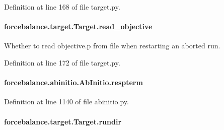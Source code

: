 Definition at line 168 of file target.\-py.

\hypertarget{classforcebalance_1_1target_1_1Target_a22bdc4bbce2020ae44b44ad3e444fda6}{
\paragraph[{read\-\_\-objective}]{\setlength{\rightskip}{0pt plus 5cm}forcebalance.\-target.\-Target.\-read\-\_\-objective\hspace{0.3cm}{\ttfamily [inherited]}}}\label{classforcebalance_1_1target_1_1Target_a22bdc4bbce2020ae44b44ad3e444fda6}


Whether to read objective.\-p from file when restarting an aborted run. 



Definition at line 172 of file target.\-py.

\hypertarget{classforcebalance_1_1abinitio_1_1AbInitio_a689e3849518b33539442a473a41ed32d}{
\paragraph[{respterm}]{\setlength{\rightskip}{0pt plus 5cm}forcebalance.\-abinitio.\-Ab\-Initio.\-respterm\hspace{0.3cm}{\ttfamily [inherited]}}}\label{classforcebalance_1_1abinitio_1_1AbInitio_a689e3849518b33539442a473a41ed32d}


Definition at line 1140 of file abinitio.\-py.

\hypertarget{classforcebalance_1_1target_1_1Target_a6872de5b2d4273b82336ea5b0da29c9e}{
\paragraph[{rundir}]{\setlength{\rightskip}{0pt plus 5cm}forcebalance.\-target.\-Target.\-rundir\hspace{0.3cm}{\ttfamily [inherited]}}}\label{classforcebalance_1_1target_1_1Target_a6872de5b2d4273b82336ea5b0da29c9e}


